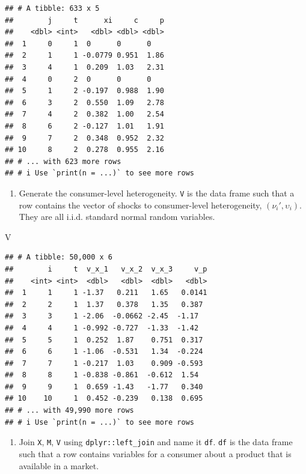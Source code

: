 \documentclass[
]{book}
\newenvironment{Shaded}{\begin{snugshade}}{\end{snugshade}}
\newcommand{\NormalTok}[1]{#1}
\providecommand{\tightlist}{%
  \setlength{\itemsep}{0pt}\setlength{\parskip}{0pt}}
\begin{document}
\begin{verbatim}
## # A tibble: 633 x 5
##        j     t      xi     c     p
##    <dbl> <int>   <dbl> <dbl> <dbl>
##  1     0     1  0      0      0   
##  2     1     1 -0.0779 0.951  1.86
##  3     4     1  0.209  1.03   2.31
##  4     0     2  0      0      0   
##  5     1     2 -0.197  0.988  1.90
##  6     3     2  0.550  1.09   2.78
##  7     4     2  0.382  1.00   2.54
##  8     6     2 -0.127  1.01   1.91
##  9     7     2  0.348  0.952  2.32
## 10     8     2  0.278  0.955  2.16
## # ... with 623 more rows
## # i Use `print(n = ...)` to see more rows
\end{verbatim}

\begin{enumerate}
\def\labelenumi{\arabic{enumi}.}
\setcounter{enumi}{3}
\tightlist
\item
  Generate the consumer-level heterogeneity. \texttt{V} is the data frame such that a row contains the vector of shocks to consumer-level heterogeneity, \((\nu_{i}', \upsilon_i)\). They are all i.i.d. standard normal random variables.
\end{enumerate}

\begin{Shaded}
\begin{Highlighting}[]
\NormalTok{V}
\end{Highlighting}
\end{Shaded}

\begin{verbatim}
## # A tibble: 50,000 x 6
##        i     t  v_x_1   v_x_2  v_x_3     v_p
##    <int> <int>  <dbl>   <dbl>  <dbl>   <dbl>
##  1     1     1 -1.37   0.211   1.65   0.0141
##  2     2     1  1.37   0.378   1.35   0.387 
##  3     3     1 -2.06  -0.0662 -2.45  -1.17  
##  4     4     1 -0.992 -0.727  -1.33  -1.42  
##  5     5     1  0.252  1.87    0.751  0.317 
##  6     6     1 -1.06  -0.531   1.34  -0.224 
##  7     7     1 -0.217  1.03    0.909 -0.593 
##  8     8     1 -0.838 -0.861  -0.612  1.54  
##  9     9     1  0.659 -1.43   -1.77   0.340 
## 10    10     1  0.452 -0.239   0.138  0.695 
## # ... with 49,990 more rows
## # i Use `print(n = ...)` to see more rows
\end{verbatim}

\begin{enumerate}
\def\labelenumi{\arabic{enumi}.}
\setcounter{enumi}{4}
\tightlist
\item
  Join \texttt{X}, \texttt{M}, \texttt{V} using \texttt{dplyr::left\_join} and name it \texttt{df}. \texttt{df} is the data frame such that a row contains variables for a consumer about a product that is available in a market.
\end{enumerate}
\end{document}
